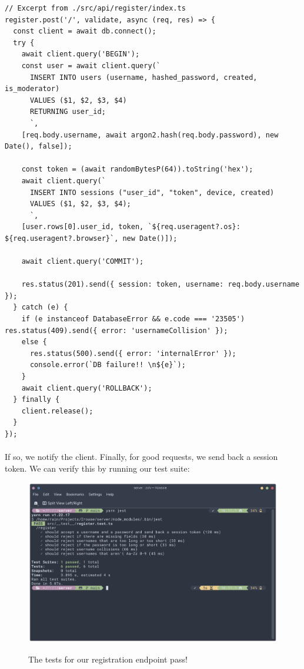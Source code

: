 \documentclass{report}
\begin{document}
\begin{verbatim}
// Excerpt from ./src/api/register/index.ts
register.post('/', validate, async (req, res) => {
  const client = await db.connect();
  try {
    await client.query('BEGIN');
    const user = await client.query(`
      INSERT INTO users (username, hashed_password, created, is_moderator) 
      VALUES ($1, $2, $3, $4) 
      RETURNING user_id;
      `,
    [req.body.username, await argon2.hash(req.body.password), new Date(), false]);

    const token = (await randomBytesP(64)).toString('hex');
    await client.query(`
      INSERT INTO sessions ("user_id", "token", device, created)
      VALUES ($1, $2, $3, $4);
      `,
    [user.rows[0].user_id, token, `${req.useragent?.os}: ${req.useragent?.browser}`, new Date()]);

    await client.query('COMMIT');

    res.status(201).send({ session: token, username: req.body.username });
  } catch (e) {
    if (e instanceof DatabaseError && e.code === '23505') res.status(409).send({ error: 'usernameCollision' });
    else {
      res.status(500).send({ error: 'internalError' });
      console.error(`DB failure!! \n${e}`);
    }
    await client.query('ROLLBACK');
  } finally {
    client.release();
  }
});
\end{verbatim}

\paragraph{}
If so, we notify the client. Finally, for good requests, we send back a session token. We can verify this by running our test suite:

\begin{figure}[H]
  \includegraphics[width=\linewidth]{./media/development/backend/tests/register/pass.png}
  \label{fig:registerValid1}
  \caption{The tests for our registration endpoint pass!}
\end{figure}
\end{document}

